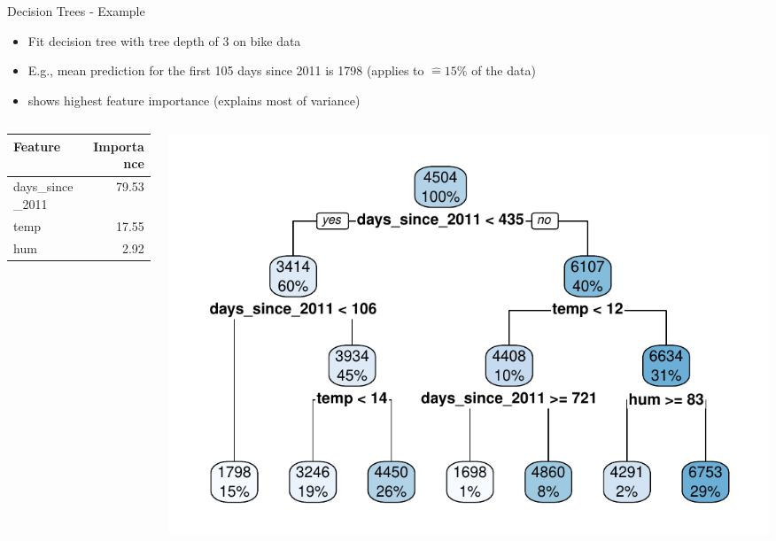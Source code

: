 \documentclass[11pt,compress,t,notes=noshow, aspectratio=169, xcolor=table]{beamer}
\begin{document}
\begin{frame}{Decision Trees - Example}
\begin{itemize}
    \item Fit decision tree with tree depth of 3 on bike data
    \item E.g., mean prediction for the first 105 days since 2011 is 1798 (applies to $\hat = 15\%$ of the data)
    \item {} shows highest feature importance (explains most of variance)
\end{itemize}
\begin{columns}[T]
\begin{column}{0.4\textwidth}
\vspace{1.5cm}
\begin{table}[ht]
\centering
\begin{tabular}{lr}
  \hline
 Feature & Importance \\
  \hline
days\_since\_2011 & 79.53 \\ 
  temp & 17.55 \\ 
  hum & 2.92 \\ 
   \hline
\end{tabular}
\end{table}
\end{column}
\begin{column}{0.6\textwidth}
  \includegraphics[width = \textwidth]{figure/tree.pdf} 
\end{column}
\end{columns}
 
\end{frame}
\end{document}

